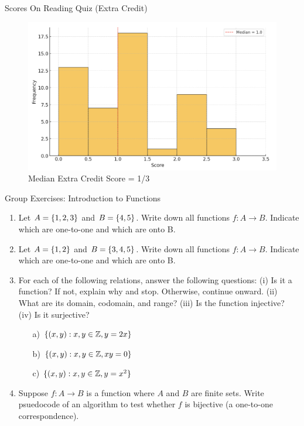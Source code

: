 \documentclass[10pt]{beamer}
\begin{document}
\begin{frame}{Scores On Reading Quiz (Extra Credit)}
\footnotesize 
\begin{figure}[ht]
        \centering
        \includegraphics[width=.75\textwidth]{images/reading_quiz_scores_intro_to_relations}
   		 \caption{Median Extra Credit Score = 1/3}
\end{figure}
\vfill 
\end{frame}



\begin{frame}{Group Exercises: Introduction to Functions}

\begin{enumerate}
	\item Let $A=\{ {1,2,3} \}$ and $B=\{ {4,5} \}$.  Write down all functions $f: A \to B$. Indicate which are one-to-one and which are onto B.
	\item Let $A=\{ {1,2} \}$ and $B=\{ {3, 4,5} \}$.  Write down all functions $f: A \to B$. Indicate which are one-to-one and which are onto B.
	\item For each of the following relations, answer the following questions:
	(i) Is it a function? If not, explain why and stop. Otherwise, continue onward.
	(ii) What are its domain, codomain, and range?
	(iii) Is the function injective? 
	(iv) Is it surjective?
	\begin{itemize}
	\item[a)] $\{ {(x,y): x,y \in \mathbb{Z}, y=2x} \}$
	\item[b)] $\{ {(x,y): x,y \in \mathbb{Z}, xy=0} \}$
	\item[c)] $\{ {(x,y): x,y \in \mathbb{Z}, y=x^2} \}$
	\end{itemize}
	\item Suppose $f: A \to B$ is a function where $A$ and $B$ are finite sets. Write psuedocode of an algorithm to test whether $f$ is bijective (a one-to-one correspondence).
\end{enumerate}

\end{frame}
\end{document}
